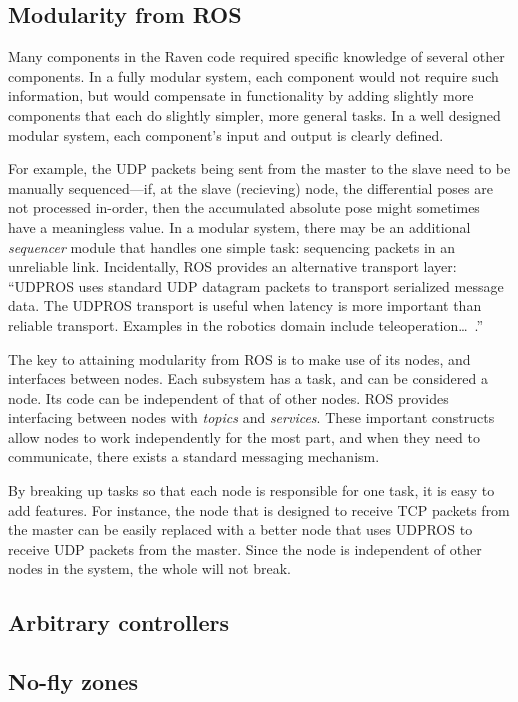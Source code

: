 \documentclass[letterpaper,twocolumn,10pt]{article}
\begin{document}
\subsection{Modularity from ROS}

Many components in the Raven code required specific knowledge of
several other components. In a fully modular system, each component
would not require such information, but would compensate in
functionality by adding slightly more components that each do slightly
simpler, more general tasks. In a well designed modular system, each
component's input and output is clearly defined.

For example, the UDP packets being sent from the master to the slave
need to be manually sequenced---if, at the slave (recieving) node, the
differential poses are not processed in-order, then the accumulated
absolute pose might sometimes have a meaningless value. In a modular
system, there may be an additional \emph{sequencer} module that
handles one simple task: sequencing packets in an unreliable
link. Incidentally, ROS provides an alternative transport layer:
``UDPROS uses standard UDP datagram packets to transport serialized
message data. The UDPROS transport is useful when latency is more
important than reliable transport. Examples in the robotics domain
include teleoperation\ldots~\cite{udpros}.''

The key to attaining modularity from ROS is to make use of its nodes, 
and interfaces between nodes. Each subsystem has a task, and can be 
considered a node. Its code can be independent of that of other nodes. 
ROS provides interfacing between nodes with \emph{topics} and 
\emph{services}. These important constructs allow nodes to work 
independently for the most part, and when they need to communicate, 
there exists a standard messaging mechanism.

By breaking up tasks so that each node is responsible for one task, 
it is easy to add features. For instance, the node that is designed 
to receive TCP packets from the master can be easily replaced with 
a better node that uses UDPROS to receive UDP packets from the master. 
Since the node is independent of other nodes in the system, the whole 
will not break.


\subsection{Arbitrary controllers}

\subsection{No-fly zones}
\end{document}
